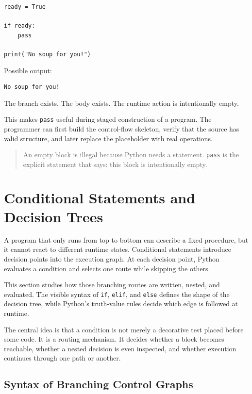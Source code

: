 \documentclass[a4paper,twoside]{report}
\begin{document}
\begin{verbatim}
ready = True

if ready:
    pass

print("No soup for you!")
\end{verbatim}

Possible output:

\begin{verbatim}
No soup for you!
\end{verbatim}

The branch exists. The body exists. The runtime action is intentionally empty.

This makes \texttt{pass} useful during staged construction of a program. The programmer can first build the control-flow skeleton, verify that the source has valid structure, and later replace the placeholder with real operations.

\begin{quote}
An empty block is illegal because Python needs a statement. \texttt{pass} is the explicit statement that says: this block is intentionally empty.
\end{quote}

\section{Conditional Statements and Decision Trees}

A program that only runs from top to bottom can describe a fixed procedure, but it cannot react to different runtime states. Conditional statements introduce decision points into the execution graph. At each decision point, Python evaluates a condition and selects one route while skipping the others.

This section studies how those branching routes are written, nested, and evaluated. The visible syntax of \texttt{if}, \texttt{elif}, and \texttt{else} defines the shape of the decision tree, while Python's truth-value rules decide which edge is followed at runtime.

The central idea is that a condition is not merely a decorative test placed before some code. It is a routing mechanism. It decides whether a block becomes reachable, whether a nested decision is even inspected, and whether execution continues through one path or another.

\subsection{Syntax of Branching Control Graphs}
\end{document}
